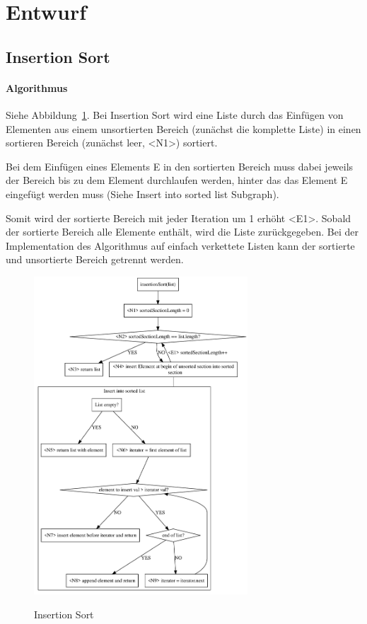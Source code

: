 \documentclass[11pt]{article}
\begin{document}
    \section{Entwurf}\label{sec:entwurf}

    \subsection{Insertion Sort}\label{subsec:insertion-sort}

    \paragraph{Algorithmus}\label{subsec:Ialgorithmus}
    Siehe Abbildung~\ref{fig:insertionS}.
    Bei Insertion Sort wird eine Liste durch das Einfügen von Elementen aus
    einem unsortierten Bereich (zunächst die komplette Liste) in einen sortieren
    Bereich (zunächst leer, <N1>) sortiert.

    Bei dem Einfügen eines Elements E in den sortierten Bereich muss dabei
    jeweils der Bereich bis zu dem Element durchlaufen werden, hinter das das
    Element E eingefügt werden muss (Siehe \frqq Insert into sorted list\flqq
    Subgraph).

    Somit wird der sortierte Bereich mit jeder Iteration um 1 erhöht <E1>.
    Sobald der sortierte Bereich alle Elemente enthält, wird die Liste
    zurückgegeben.
    Bei der Implementation des Algorithmus auf einfach verkettete Listen
    kann der sortierte und unsortierte Bereich getrennt werden.


    \begin{figure}[hbt]
        \caption{Insertion Sort}
        \centering
        \includegraphics[width = 8cm]{insertionS}\label{fig:insertionS}
    \end{figure}
    \FloatBarrier
\end{document}
